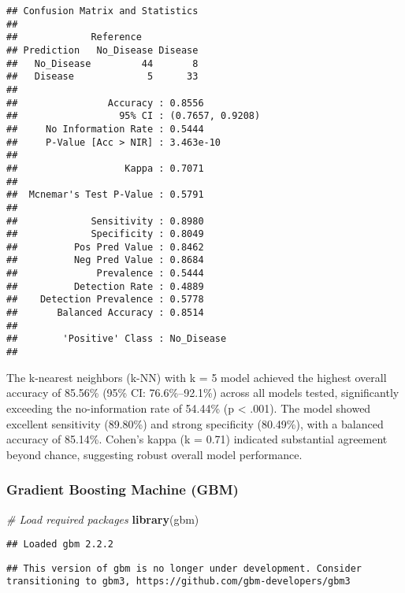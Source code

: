 \documentclass[
]{article}
\newenvironment{Shaded}{\begin{snugshade}}{\end{snugshade}}
\newcommand{\CommentTok}[1]{\textcolor[rgb]{0.56,0.35,0.01}{\textit{#1}}}
\newcommand{\FunctionTok}[1]{\textcolor[rgb]{0.13,0.29,0.53}{\textbf{#1}}}
\newcommand{\NormalTok}[1]{#1}
\begin{document}
\begin{verbatim}
## Confusion Matrix and Statistics
## 
##             Reference
## Prediction   No_Disease Disease
##   No_Disease         44       8
##   Disease             5      33
##                                           
##                Accuracy : 0.8556          
##                  95% CI : (0.7657, 0.9208)
##     No Information Rate : 0.5444          
##     P-Value [Acc > NIR] : 3.463e-10       
##                                           
##                   Kappa : 0.7071          
##                                           
##  Mcnemar's Test P-Value : 0.5791          
##                                           
##             Sensitivity : 0.8980          
##             Specificity : 0.8049          
##          Pos Pred Value : 0.8462          
##          Neg Pred Value : 0.8684          
##              Prevalence : 0.5444          
##          Detection Rate : 0.4889          
##    Detection Prevalence : 0.5778          
##       Balanced Accuracy : 0.8514          
##                                           
##        'Positive' Class : No_Disease      
## 
\end{verbatim}

The k-nearest neighbors (k-NN) with k = 5 model achieved the highest
overall accuracy of 85.56\% (95\% CI: 76.6\%--92.1\%) across all models
tested, significantly exceeding the no-information rate of 54.44\% (p
\textless{} .001). The model showed excellent sensitivity (89.80\%) and
strong specificity (80.49\%), with a balanced accuracy of 85.14\%.
Cohen's kappa (k = 0.71) indicated substantial agreement beyond chance,
suggesting robust overall model performance.

\subsubsection{Gradient Boosting Machine
(GBM)}\label{gradient-boosting-machine-gbm}

\begin{Shaded}
\begin{Highlighting}[]
\CommentTok{\# Load required packages}
\FunctionTok{library}\NormalTok{(gbm)}
\end{Highlighting}
\end{Shaded}

\begin{verbatim}
## Loaded gbm 2.2.2
\end{verbatim}

\begin{verbatim}
## This version of gbm is no longer under development. Consider transitioning to gbm3, https://github.com/gbm-developers/gbm3
\end{verbatim}
\end{document}
